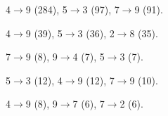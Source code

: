 \begin{description}[leftmargin=0pt,labelindent=0pt,style=unboxed,itemsep=2pt]
\item[Gaussian NB.] 4$\to$9 (284), 5$\to$3 (97), 7$\to$9 (91).
\item[Softmax regression.] 4$\to$9 (39), 5$\to$3 (36), 2$\to$8 (35).
\item[MLP.] 7$\to$9 (8), 9$\to$4 (7), 5$\to$3 (7).
\item[AdaBoost-SAMME.] 5$\to$3 (12), 4$\to$9 (12), 7$\to$9 (10).
\item[CNN.] 4$\to$9 (8), 9$\to$7 (6), 7$\to$2 (6).
\end{description}
